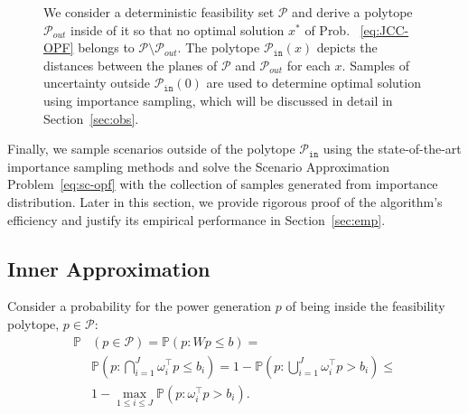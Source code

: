 \begin{figure}

\caption{We consider a deterministic feasibility set $\mathcal{P}$ and derive a polytope $\mathcal{P}_{out}$ inside of it so that no optimal solution $x^*$ of Prob.~ \eqref{eq:JCC-OPF} belongs to $\mathcal{P}\setminus \mathcal{P}_{out}$. The polytope $\mathcal{P}_{\texttt{in}}(x)$ depicts the distances between the planes of $\mathcal{P}$ and $\mathcal{P}_{out}$ for each $x$.
Samples of uncertainty outside $\mathcal{P}_{\texttt{in}}(0)$ are used to determine optimal solution using importance sampling, which will be discussed in detail in Section~\ref{sec:obs}.}
  \label{fig:10}
\end{figure}

Finally, we sample scenarios outside of the polytope $\mathcal{P}_{\texttt{in}}$ using the state-of-the-art importance sampling methods \cite{owen2019importance,lukashevich2021power} and solve the Scenario Approximation Problem~\eqref{eq:sc-opf} with the collection of samples generated from importance distribution. Later in this section, we provide rigorous proof of the algorithm's efficiency and justify its empirical performance in Section~\ref{sec:emp}. 

\subsection{Inner Approximation}

Consider a probability for the power generation $p$ of being inside the feasibility polytope, $p\in \mathcal{P}$:
\begin{align*}
  \mathbb{P}&(p\in \mathcal{P}) = 
  \mathbb{P}(p: Wp \le b) = \\
  & \mathbb{P}\left(p: \bigcap_{i=1}^J \omega_i^\top p \le b_i\right) = 1 - \mathbb{P}\left(p: \bigcup_{i=1}^J \omega_i^\top p > b_i\right)\le\\
  & 1 - \max_{1\le i\le J}\mathbb{P}\left(p: \omega_i^\top p > b_i\right).
\end{align*}

